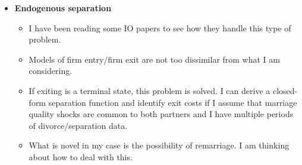\documentclass{article}
\begin{document}
\begin{itemize}
\item \textbf{Endogenous separation}
\begin{itemize}
	\item I have been reading some IO papers to see how they handle this type of problem.
	\item Models of firm entry/firm exit are not too dissimilar from what I am considering.
	\item If exiting is a terminal state, this problem is solved. I can derive a closed-form separation function and identify exit costs if I assume that marriage quality shocks are common to both partners and I have multiple periods of divorce/separation data.
	\item What is novel in my case is the possibility of remarriage. I am thinking about how to deal with this.
\end{itemize}



\end{itemize}


\newpage

%
\end{document}

